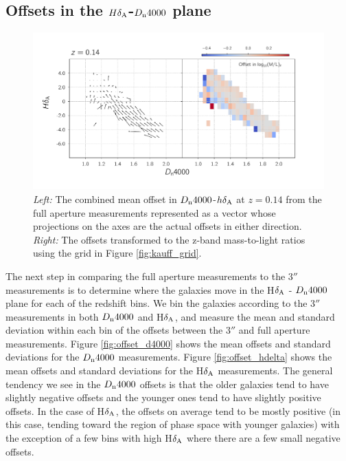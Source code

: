\subsection{Offsets in the $H\delta_{\rm A}$-$D_{\rm n}4000$ plane}

\begin{figure}
\includegraphics[width=\textwidth]{figures/mlz_offset_c.pdf}
\caption[ \emph{Left:} The combined mean offset in $D_{\rm n}4000$-$h\delta_{\rm A}$ at $z=0.14$ from the full aperture measurements represented as a vector whose projections on the axes are the actual offsets in either direction. \emph{Right:} The offsets transformed to the z-band mass-to-light ratios using the grid in Figure \ref{fig:kauff_grid}. ]{ \emph{Left:} The combined mean offset in $D_{\rm n}4000$-$h\delta_{\rm A}$ at $z=0.14$ from the full aperture measurements represented as a vector whose projections on the axes are the actual offsets in either direction. \emph{Right:} The offsets transformed to the z-band mass-to-light ratios using the grid in Figure \ref{fig:kauff_grid}.
\label{fig:offset_quiver3}}
\end{figure}

The next step in comparing the full aperture measurements to the 3$''$
measurements is to determine where the galaxies move in the 
H$\delta_{\rm A}$ - $D_{\rm n}4000$ plane for each of the redshift 
bins. We bin the galaxies according to the 3$''$ measurements
in both $D_{\rm n}4000$ and H$\delta_{\rm A}$, and measure the 
mean and standard deviation within each bin of the offsets between
the 3$''$ and full aperture measurements. Figure \ref{fig:offset_d4000} 
shows the mean offsets and standard deviations for the 
$D_{\rm n}4000$ measurements. Figure 
\ref{fig:offset_hdelta} shows the mean offsets and standard deviations
for the  H$\delta_{\rm A}$ measurements. 
The general tendency we see in the $D_{\rm n}4000$ offsets is that 
the older galaxies tend to have slightly negative offsets and the 
younger ones tend to have slightly positive offsets. In the case of 
H$\delta_{\rm A}$, the offsets on average tend to be mostly positive 
(in this case, tending toward the region of phase space with 
younger galaxies) with the exception of a few bins with high 
H$\delta_{\rm A}$ where there are a few small negative offsets.\\

